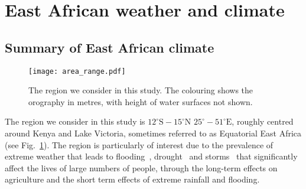 \documentclass[../main.tex]{subfiles}
\begin{document}
\section{East African weather and climate}
\label{sec:eafrica_weather}
\subsection{Summary of East African climate}

\begin{figure}[t]
     \centering
     \texttt{[image: area\_range.pdf]}
     
     \caption{The region we consider in this study. The colouring shows the orography in metres, with height of water surfaces not shown.}
     \label{fig:cgan_sample}
\end{figure}

The region we consider in this study is $12^{\circ}\text{S}-15^{\circ}\text{N}$   $25^{\circ}-51^{\circ}\text{E}$, roughly centred around Kenya and Lake Victoria, sometimes referred to as Equatorial East Africa (see Fig.~\ref{fig:cgan_sample}). The region is particularly of interest due to the prevalence of extreme weather that leads to flooding~\citep{kilavi_extreme_2018,wainwright_extreme_2021}, drought~\citep{gebremeskel_haile_droughts_2019} and storms~\citep{thiery_hazardous_2016, woodhams_identifying_2019} that significantly affect the lives of large numbers of people, through the long-term effects on agriculture and the short term effects of extreme rainfall and flooding. 


\end{document}
